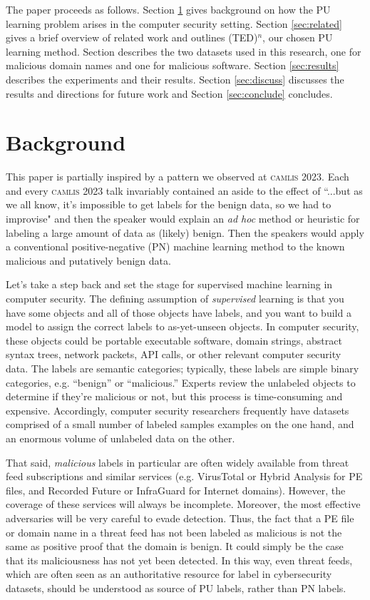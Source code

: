 \documentclass[conference]{IEEEtran}
\begin{document}
    The paper proceeds as follows. Section \ref{sec:background} gives background on how the PU learning problem arises in the computer security setting. Section \ref{sec:related} gives a brief overview of related work and outlines (TED)${}^n$, our chosen PU learning method. Section \label{sec:data} describes the two datasets used in this research, one for malicious domain names and one for malicious software. Section \ref{sec:results} describes the experiments and their results. Section \ref{sec:discuss} discusses the results and directions for future work and Section \ref{sec:conclude} concludes.


\section{Background}
\label{sec:background} 

    This paper is partially inspired by a pattern we observed at \textsc{camlis} 2023. Each and every \textsc{camlis} 2023 talk invariably contained an aside to the effect of ``...but as we all know, it's impossible to get labels for the benign data, so we had to improvise" and then the speaker would  explain an \textit{ad hoc} method or heuristic for labeling a large amount of data as (likely) benign. Then the speakers would apply a conventional positive-negative (PN) machine learning method to the known malicious and putatively benign data. 

    Let's take a step back and set the stage for supervised machine learning in computer security. The defining assumption of \textit{supervised} learning is that you have some objects and all of those objects have labels, and you want to build a model to assign the correct labels to as-yet-unseen objects. In computer security, these objects could be portable executable software, domain strings, abstract syntax trees, network packets, API calls, or other relevant computer security data. The labels are semantic categories; typically, these labels are simple binary categories, e.g. ``benign'' or ``malicious.'' Experts review the unlabeled objects to determine if they're malicious or not, but this process is time-consuming and expensive. Accordingly, computer security researchers frequently have datasets comprised of a small number of labeled samples examples on the one hand, and an enormous volume of unlabeled data on the other.

    That said, \textit{malicious} labels in particular are often widely available from threat feed subscriptions and similar services (e.g. VirusTotal or Hybrid Analysis for PE files, and Recorded Future or InfraGuard for Internet domains). However, the coverage of these services will always be incomplete. Moreover, the most effective adversaries will be very careful to evade detection. Thus, the fact that a PE file or domain name in a threat feed has not been labeled as malicious is not the same as positive proof that the domain is benign. It could simply be the case that its maliciousness has not yet been detected. In this way, even threat feeds, which are often seen as an authoritative resource for label in cybersecurity datasets, should be understood as source of PU labels, rather than PN labels.
\end{document}
